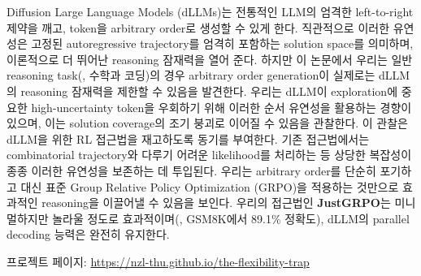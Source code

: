 Diffusion Large Language Models (dLLMs)는 전통적인 LLM의 엄격한 left-to-right 제약을 깨고, token을 arbitrary order로 생성할 수 있게 한다.
직관적으로 이러한 유연성은 고정된 autoregressive trajectory를 엄격히 포함하는 solution space를 의미하며, 이론적으로 더 뛰어난 reasoning 잠재력을 열어 준다.
하지만 이 논문에서 우리는 일반 reasoning task(\eg, 수학과 코딩)의 경우 arbitrary order generation이 실제로는 dLLM의 reasoning 잠재력을 제한할 수 있음을 발견한다.
우리는 dLLM이 exploration에 중요한 high-uncertainty token을 우회하기 위해 이러한 순서 유연성을 활용하는 경향이 있으며, 이는 solution coverage의 조기 붕괴로 이어질 수 있음을 관찰한다.
이 관찰은 dLLM을 위한 RL 접근법을 재고하도록 동기를 부여한다. 기존 접근법에서는 combinatorial trajectory와 다루기 어려운 likelihood를 처리하는 등 상당한 복잡성이 종종 이러한 유연성을 보존하는 데 투입된다.
우리는 arbitrary order를 단순히 포기하고 대신 표준 Group Relative Policy Optimization (GRPO)을 적용하는 것만으로 효과적인 reasoning을 이끌어낼 수 있음을 보인다.
우리의 접근법인 \textbf{JustGRPO}는 미니멀하지만 놀라울 정도로 효과적이며(\eg, GSM8K에서 89.1\% 정확도), dLLM의 parallel decoding 능력은 완전히 유지한다.
\begin{center}
    프로젝트 페이지: \url{https://nzl-thu.github.io/the-flexibility-trap}
\end{center}

